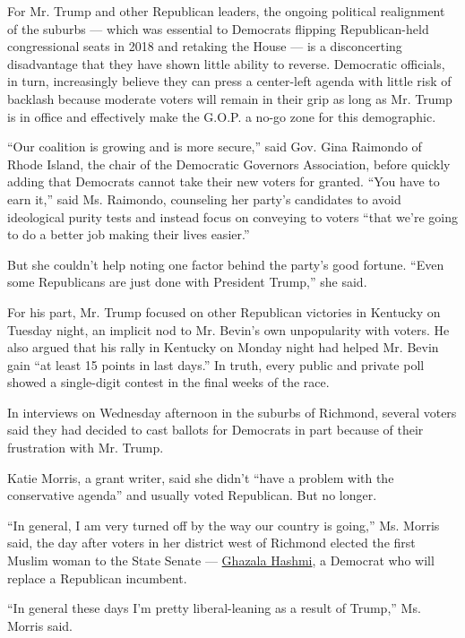 For Mr. Trump and other Republican leaders, the ongoing political
realignment of the suburbs --- which was essential to Democrats flipping
Republican-held congressional seats in 2018 and retaking the House ---
is a disconcerting disadvantage that they have shown little ability to
reverse. Democratic officials, in turn, increasingly believe they can
press a center-left agenda with little risk of backlash because moderate
voters will remain in their grip as long as Mr. Trump is in office and
effectively make the G.O.P. a no-go zone for this demographic.

``Our coalition is growing and is more secure,'' said Gov. Gina Raimondo
of Rhode Island, the chair of the Democratic Governors Association,
before quickly adding that Democrats cannot take their new voters for
granted. ``You have to earn it,'' said Ms. Raimondo, counseling her
party's candidates to avoid ideological purity tests and instead focus
on conveying to voters ``that we're going to do a better job making
their lives easier.''

But she couldn't help noting one factor behind the party's good fortune.
``Even some Republicans are just done with President Trump,'' she said.

For his part, Mr. Trump focused on other Republican victories in
Kentucky on Tuesday night, an implicit nod to Mr. Bevin's own
unpopularity with voters. He also argued that his rally in Kentucky on
Monday night had helped Mr. Bevin gain ``at least 15 points in last
days.'' In truth, every public and private poll showed a single-digit
contest in the final weeks of the race.

In interviews on Wednesday afternoon in the suburbs of Richmond, several
voters said they had decided to cast ballots for Democrats in part
because of their frustration with Mr. Trump.

Katie Morris, a grant writer, said she didn't ``have a problem with the
conservative agenda'' and usually voted Republican. But no longer.

``In general, I am very turned off by the way our country is going,''
Ms. Morris said, the day after voters in her district west of Richmond
elected the first Muslim woman to the State Senate ---
\href{https://www.nytimes3xbfgragh.onion/2019/11/06/us/ghazala-hashmi-virginia-senate.html}{Ghazala
Hashmi}, a Democrat who will replace a Republican incumbent.

``In general these days I'm pretty liberal-leaning as a result of
Trump,'' Ms. Morris said.

